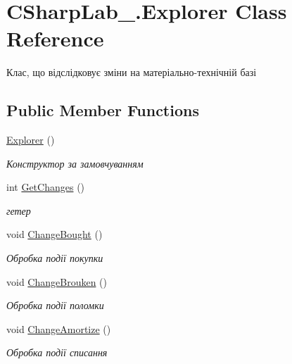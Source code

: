 \hypertarget{class_c_sharp_lab__1_1_1_explorer}{}\section{C\+Sharp\+Lab\+\_.\+Explorer Class Reference}
\label{class_c_sharp_lab__1_1_1_explorer}


Клас, що відслідковує зміни на матеріально-\/технічній базі  


\subsection*{Public Member Functions}
\begin{DoxyCompactItemize}
\item 
\hyperlink{class_c_sharp_lab__1_1_1_explorer_a64fd7698367e71057067ce32a6c47d67}{Explorer} ()
\begin{DoxyCompactList}\small\item\em Конструктор за замовчуванням \end{DoxyCompactList}\item 
int \hyperlink{class_c_sharp_lab__1_1_1_explorer_a42cbc06f2e5c5614bea708dbc43250a6}{Get\+Changes} ()
\begin{DoxyCompactList}\small\item\em гетер \end{DoxyCompactList}\item 
void \hyperlink{class_c_sharp_lab__1_1_1_explorer_a4b685e3fdc095b24a2854f23a44e439b}{Change\+Bought} ()
\begin{DoxyCompactList}\small\item\em Обробка події покупки \end{DoxyCompactList}\item 
void \hyperlink{class_c_sharp_lab__1_1_1_explorer_a65669ed2aaf2eb10382e4644dec50391}{Change\+Brouken} ()
\begin{DoxyCompactList}\small\item\em Обробка події поломки \end{DoxyCompactList}\item 
void \hyperlink{class_c_sharp_lab__1_1_1_explorer_a8f1c353e08ae3448ea231da558b048d9}{Change\+Amortize} ()
\begin{DoxyCompactList}\small\item\em Обробка події списання \end{DoxyCompactList}\end{DoxyCompactItemize}


